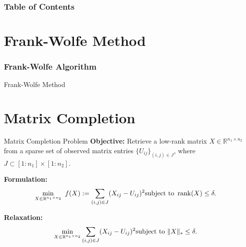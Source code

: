 \documentclass[12pt]{beamer}
\begin{document}


\frame{\titlepage}

\begin{frame}
    \frametitle{Table of Contents}
    \tableofcontents
    \end{frame}
    
\section{Frank-Wolfe Method}

\begin{frame}
    \frametitle{Frank-Wolfe Algorithm}
\begin{algorithm}[H]
\caption{Frank-Wolfe Method}
\For{\(k = 0, 1, \dots\)}{
    Compute \(s_k = \arg\min_{s \in C} \langle \nabla f(x_k), s \rangle\) using LMO\;
    Set direction \(d_k^{FW} = s_k - x_k\)\;
    Choose step size \(\alpha_k \in (0, 1]\)\;
    Update \(x_{k+1} = x_k + \alpha_k d_k^{FW}\)\;
    \If{stopping condition is met}{break\;}
}
\end{algorithm}
\end{frame}

\section{Matrix Completion}

\begin{frame}{Matrix Completion Problem}
    \textbf{Objective:} Retrieve a low-rank matrix $X \in \mathbb{R}^{n_1 \times n_2}$ from a sparse set of observed matrix entries $\{ U_{ij} \}_{(i,j) \in J}$, where $J \subset [1:n_1] \times [1:n_2]$.
    \vspace{0.3cm}

    \textbf{Formulation:}
    \begin{equation*}
        \min_{X \in \mathbb{R}^{n_1 \times n_2}} \ f(X) := \sum_{(i,j) \in J} (X_{ij} - U_{ij})^2 \\
        \text{subject to } \operatorname{rank}(X) \leq \delta.
    \end{equation*}
    \vspace{0.3cm}

    \textbf{Relaxation:}
    \begin{equation*}
        \min_{X \in \mathbb{R}^{n_1 \times n_2}} \sum_{(i,j) \in J} (X_{ij} - U_{ij})^2 \\
        \text{subject to } \|X\|_* \leq \delta.
    \end{equation*}
\end{frame}
\end{document}
